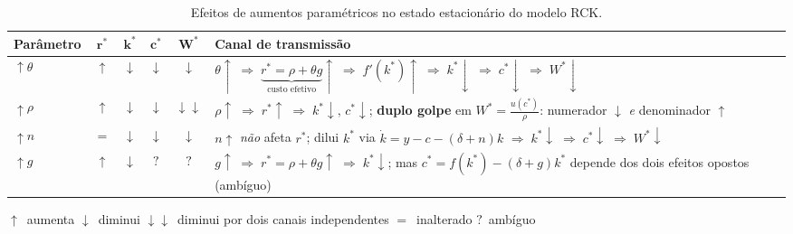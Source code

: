 \documentclass[12pt, a4paper]{article}
\begin{document}
\begin{table}[H]
\centering
\small
\setlength{\tabcolsep}{5pt}
\renewcommand{\arraystretch}{1.45}
\caption{Efeitos de aumentos paramétricos no estado estacionário do modelo RCK.}
\label{tab:welfare_cs}
\begin{tabular}{@{}lcccc p{6.8cm}@{}}
\toprule
\textbf{Parâmetro} & $\boldsymbol{r^*}$ & $\boldsymbol{k^*}$ & $\boldsymbol{c^*}$ & $\boldsymbol{W^*}$
  & \textbf{Canal de transmissão} \\
\midrule
$\uparrow\theta$
  & \textcolor{blue!70!black}{$\uparrow$}
  & \textcolor{red!70!black}{$\downarrow$}
  & \textcolor{red!70!black}{$\downarrow$}
  & \textcolor{red!70!black}{$\downarrow$}
  & $\theta\!\uparrow\;\Rightarrow\;
     \underbrace{r^*{=}\rho{+}\theta g}_{\text{custo efetivo}}\!\uparrow\;
     \Rightarrow\; f'(k^*)\uparrow\;
     \Rightarrow\; k^*\downarrow\;
     \Rightarrow\; c^*\downarrow\;
     \Rightarrow\; W^*\downarrow$ \\[2pt]
$\uparrow\rho$
  & \textcolor{blue!70!black}{$\uparrow$}
  & \textcolor{red!70!black}{$\downarrow$}
  & \textcolor{red!70!black}{$\downarrow$}
  & \textcolor{red!70!black}{$\downarrow\!\downarrow$}
  & $\rho\!\uparrow\;\Rightarrow\; r^*\uparrow \;\Rightarrow\; k^*\downarrow,\,c^*\downarrow$;\quad
     \textbf{duplo golpe} em $W^*{=}\tfrac{u(c^*)}{\rho}$:
     numerador $\downarrow$ \textit{e} denominador $\uparrow$ \\[2pt]
$\uparrow n$
  & \textcolor{grayrbc}{$=$}
  & \textcolor{red!70!black}{$\downarrow$}
  & \textcolor{red!70!black}{$\downarrow$}
  & \textcolor{red!70!black}{$\downarrow$}
  & $n\!\uparrow$ \textit{não} afeta $r^*$;\;
     dilui $k^*$ via $\dot{k}=y-c-(\delta{+}n)k$\;
     $\Rightarrow\; k^*\downarrow\;\Rightarrow\; c^*\downarrow\;\Rightarrow\; W^*\downarrow$ \\[2pt]
$\uparrow g$
  & \textcolor{blue!70!black}{$\uparrow$}
  & \textcolor{red!70!black}{$\downarrow$}
  & \textcolor{orangerbc}{$?$}
  & \textcolor{orangerbc}{$?$}
  & $g\!\uparrow\;\Rightarrow\; r^*{=}\rho{+}\theta g\uparrow\;\Rightarrow\; k^*\downarrow$;\;
     mas $c^*{=}f(k^*)-(\delta{+}g)k^*$ depende dos dois efeitos opostos
     (ambíguo) \\
\bottomrule
\end{tabular}
\end{table}

\noindent\footnotesize
\textcolor{blue!70!black}{$\uparrow$}~aumenta\quad
\textcolor{red!70!black}{$\downarrow$}~diminui\quad
\textcolor{red!70!black}{$\downarrow\!\downarrow$}~diminui por dois canais independentes\quad
\textcolor{grayrbc}{$=$}~inalterado\quad
\textcolor{orangerbc}{$?$}~ambíguo
\normalsize
\end{document}
